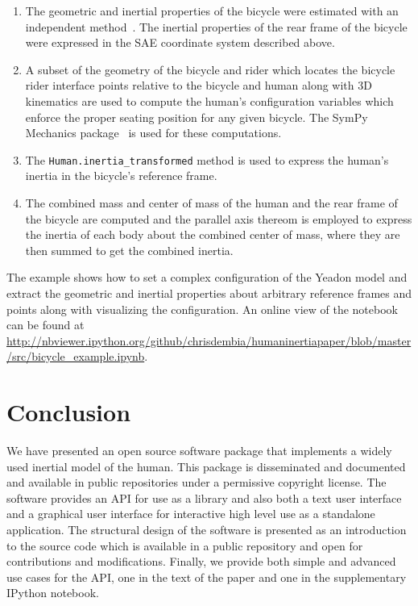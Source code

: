 \documentclass[10pt]{article}
\begin{document}
\begin{enumerate}
  \item The geometric and inertial properties of the bicycle were estimated
    with an independent method~\cite{Moore2012}. The inertial properties of the
    rear frame of the bicycle were expressed in the SAE coordinate system
    described above.
  \item A subset of the geometry of the bicycle and rider which locates the
    bicycle rider interface points relative to the bicycle and human along with
    3D kinematics are used to compute the human's configuration variables which
    enforce the proper seating position for any given bicycle. The SymPy
    Mechanics package~\cite{Gede2013} is used for these computations.
  \item The \verb+Human.inertia_transformed+ method is used to express the
    human's inertia in the bicycle's reference frame.
  \item The combined mass and center of mass of the human and the rear frame of
    the bicycle are computed and the parallel axis thereom is employed to
    express the inertia of each body about the combined center of mass, where
    they are then summed to get the combined inertia.
\end{enumerate}

The example shows how to set a complex configuration of the Yeadon model and
extract the geometric and inertial properties about arbitrary reference frames
and points along with visualizing the configuration. An online view of the
notebook can be found at
\url{http://nbviewer.ipython.org/github/chrisdembia/humaninertiapaper/blob/master/src/bicycle_example.ipynb}.

\section*{Conclusion}
We have presented an open source software package that implements a widely used
inertial model of the human. This package is disseminated and documented and
available in public repositories under a permissive copyright license. The
software provides an API for use as a library and also both a text user
interface and a graphical user interface for interactive high level use as a
standalone application. The structural design of the software is presented as
an introduction to the source code which is available in a public repository
and open for contributions and modifications. Finally, we provide both simple
and advanced use cases for the API, one in the text of the paper and one in the
supplementary IPython notebook.
\end{document}
